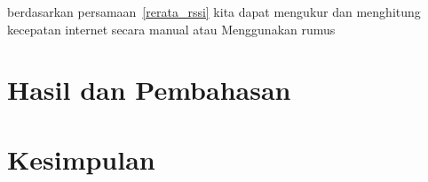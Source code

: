 \documentclass[conference]{IEEEtran}
\begin{document}
berdasarkan persamaan~\ref{rerata_rssi} kita dapat mengukur dan menghitung 
kecepatan internet secara manual atau Menggunakan rumus 

\begin{figure}[htbp]
    
\end{figure}

\section{Hasil dan Pembahasan}



\section{Kesimpulan}



\end{document}
